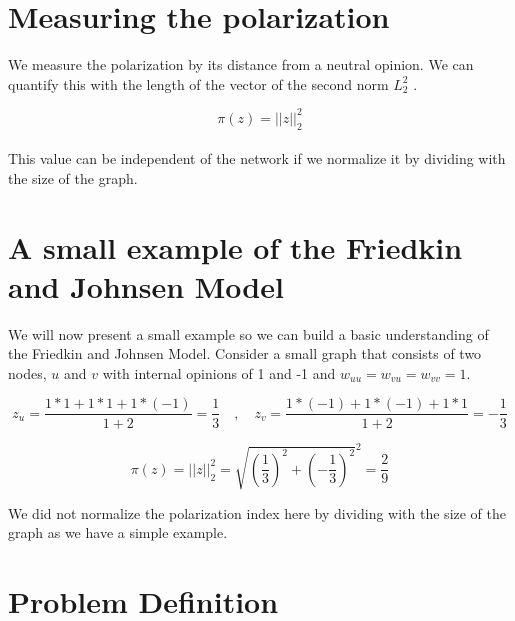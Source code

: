 \section{Measuring the polarization}
\label{sec:meas}

\noindent We measure the polarization by its distance from a neutral opinion. We can quantify this with the length of the vector of the second norm $L_{2}^2$ \cite{tsapMatakosTerzi}.

\begin{equation}
	\pi(z) = ||z||_{2}^2
\end{equation}
\\
This value can be independent of the network if we normalize it by dividing with the size of the graph.
\clearpage

\section{A small example of the Friedkin and Johnsen Model}
\label{sec:example}
We will now present a small example so we can build a basic understanding of the Friedkin and Johnsen Model. Consider a small graph that consists of two nodes, $u$ and $v$ with internal opinions of 1 and -1 and $w_{uu} = w_{vu} = w_{vv} = 1$.

\begin{equation} 
	 z_u = \frac{1*1 + 1*1 + 1*(-1)}{1 + 2} = \frac{1}{3} \quad, \quad
	 z_v = \frac{1*(-1) + 1*(-1) + 1*1}{1 + 2} = -\frac{1}{3}
\end{equation}

\begin{equation}
	\pi(z) = ||z||_{2}^2 = \sqrt{(\frac{1}{3})^2 + (-\frac{1}{3})^2}^2 = \frac{2}{9}			   
\end{equation}

\noindent We did not normalize the polarization index here by dividing with the size of the graph as we have a simple example.

\section{Problem Definition}
\label{sec:problemDef}

